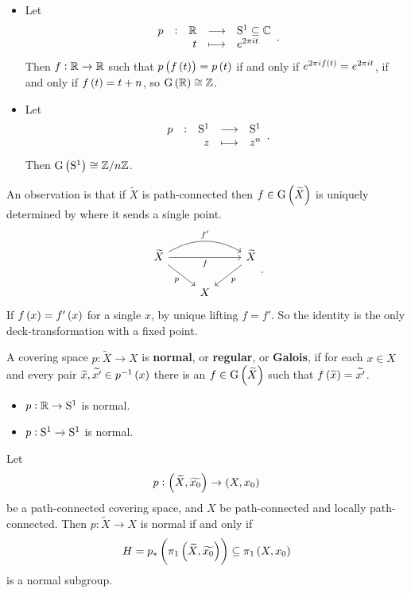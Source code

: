 \begin{example*}
\hfill
\begin{itemize}
\item Let
$$ \function[p]{\RR}{\S^1 \subseteq \CC}{t}{e^{2\pi i t}}. $$
Then $ f : \RR \to \RR $ such that $ p\br{f\br{t}} = p\br{t} $ if and only if $ e^{2\pi if\br{t}} = e^{2\pi it} $, if and only if $ f\br{t} = t + n $, so $ \G\br{\RR} \cong \ZZ $.
\item Let
$$ \function[p]{\S^1}{\S^1}{z}{z^n}. $$
Then $ \G\br{\S^1} \cong \ZZ / n\ZZ $.
\end{itemize}
\end{example*}

An observation is that if $ \widetilde{X} $ is path-connected then $ f \in \G\br{\widetilde{X}} $ is uniquely determined by where it sends a single point.
$$
\begin{tikzcd}
\widetilde{X} \arrow[swap]{rr}{f} \arrow[bend left=30]{rr}{f'} \arrow[swap]{dr}{p} & & \widetilde{X} \arrow{dl}{p} \\
& X &
\end{tikzcd}.
$$
If $ f\br{x} = f'\br{x} $ for a single $ x $, by unique lifting $ f = f' $. So the identity is the only deck-transformation with a fixed point.

\pagebreak

\begin{definition*}
A covering space $ p : \widetilde{X} \to X $ is \textbf{normal}, or \textbf{regular}, or \textbf{Galois}, if for each $ x \in X $ and every pair $ \widetilde{x}, \widetilde{x'} \in p^{-1}\br{x} $ there is an $ f \in \G\br{\widetilde{X}} $ such that $ f\br{\widetilde{x}} = \widetilde{x'} $.
\end{definition*}

\begin{example*}
\hfill
\begin{itemize}
\item $ p : \RR \to \S^1 $ is normal.
\item $ p : \S^1 \to \S^1 $ is normal.
\end{itemize}
\end{example*}

\begin{proposition}
Let
$$ p : \br{\widetilde{X}, \widetilde{x_0}} \to \br{X, x_0} $$
be a path-connected covering space, and $ X $ be path-connected and locally path-connected. Then $ p : \widetilde{X} \to X $ is normal if and only if
$$ H = p_*\br{\pi_1\br{\widetilde{X}, \widetilde{x_0}}} \subseteq \pi_1\br{X, x_0} $$
is a normal subgroup.
\end{proposition}


